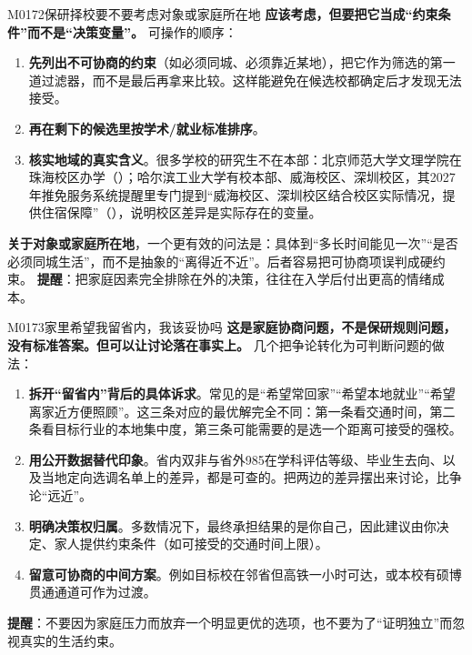 \begin{qa}{M0172}{保研择校要不要考虑对象或家庭所在地}
\textbf{应该考虑，但要把它当成“约束条件”而不是“决策变量”。}
可操作的顺序：
\begin{enumerate}
  \item \textbf{先列出不可协商的约束}（如必须同城、必须靠近某地），把它作为筛选的第一道过滤器，而不是最后再拿来比较。这样能避免在候选校都确定后才发现无法接受。
  \item \textbf{再在剩下的候选里按学术/就业标准排序}。
  \item \textbf{核实地域的真实含义}。很多学校的研究生不在本部：北京师范大学文理学院在珠海校区办学（）；哈尔滨工业大学有校本部、威海校区、深圳校区，其2027年推免服务系统提醒里专门提到“威海校区、深圳校区结合校区实际情况，提供住宿保障”（），说明校区差异是实际存在的变量。
\end{enumerate}
\textbf{关于对象或家庭所在地}，一个更有效的问法是：具体到“多长时间能见一次”“是否必须同城生活”，而不是抽象的“离得近不近”。后者容易把可协商项误判成硬约束。
\textbf{提醒}：把家庭因素完全排除在外的决策，往往在入学后付出更高的情绪成本。
\end{qa}

\begin{qa}{M0173}{家里希望我留省内，我该妥协吗}
\textbf{这是家庭协商问题，不是保研规则问题，没有标准答案。但可以让讨论落在事实上。}
几个把争论转化为可判断问题的做法：
\begin{enumerate}
  \item \textbf{拆开“留省内”背后的具体诉求}。常见的是“希望常回家”“希望本地就业”“希望离家近方便照顾”。这三条对应的最优解完全不同：第一条看交通时间，第二条看目标行业的本地集中度，第三条可能需要的是选一个距离可接受的强校。
  \item \textbf{用公开数据替代印象}。省内双非与省外985在学科评估等级、毕业生去向、以及当地定向选调名单上的差异，都是可查的。把两边的差异摆出来讨论，比争论“远近”。
  \item \textbf{明确决策权归属}。多数情况下，最终承担结果的是你自己，因此建议由你决定、家人提供约束条件（如可接受的交通时间上限）。
  \item \textbf{留意可协商的中间方案}。例如目标校在邻省但高铁一小时可达，或本校有硕博贯通通道可作为过渡。
\end{enumerate}
\textbf{提醒}：不要因为家庭压力而放弃一个明显更优的选项，也不要为了“证明独立”而忽视真实的生活约束。
\end{qa}

